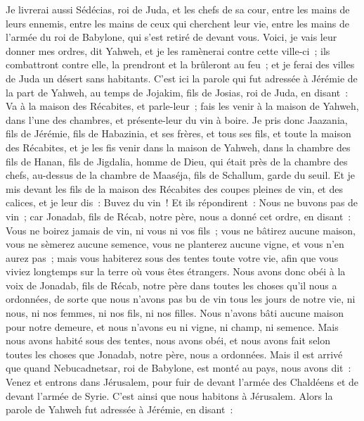 \begin{multicols}{2}
Je livrerai aussi Sédécias, roi de Juda, et les chefs de sa cour, entre les mains de leurs ennemis, entre les mains de ceux qui cherchent leur vie, entre les mains de l'armée du roi de Babylone, qui s'est retiré de devant vous.
Voici, je vais leur donner mes ordres, dit Yahweh, et je les ramènerai contre cette ville-ci~; ils combattront contre elle, la prendront et la brûleront au feu~; et je ferai des villes de Juda un désert sans habitants.
\VerseOne{}C'est ici la parole qui fut adressée à Jérémie de la part de Yahweh, au temps de Jojakim, fils de Josias, roi de Juda, en disant~:
Va à la maison des Récabites, et parle-leur~; fais les venir à la maison de Yahweh, dans l'une des chambres, et présente-leur du vin à boire.
Je pris donc Jaazania, fils de Jérémie, fils de Habazinia, et ses frères, et tous ses fils, et toute la maison des Récabites,
et je les fis venir dans la maison de Yahweh, dans la chambre des fils de Hanan, fils de Jigdalia, homme de Dieu, qui était près de la chambre des chefs, au-dessus de la chambre de Maaséja, fils de Schallum, garde du seuil.
Et je mis devant les fils de la maison des Récabites des coupes pleines de vin, et des calices, et je leur dis~: Buvez du vin~!
Et ils répondirent~: Nous ne buvons pas de vin~; car Jonadab, fils de Récab, notre père, nous a donné cet ordre, en disant~: Vous ne boirez jamais de vin, ni vous ni vos fils~;
vous ne bâtirez aucune maison, vous ne sèmerez aucune semence, vous ne planterez aucune vigne, et vous n'en aurez pas~; mais vous habiterez sous des tentes toute votre vie, afin que vous viviez longtemps sur la terre où vous êtes étrangers.
Nous avons donc obéi à la voix de Jonadab, fils de Récab, notre père dans toutes les choses qu'il nous a ordonnées, de sorte que nous n'avons pas bu de vin tous les jours de notre vie, ni nous, ni nos femmes, ni nos fils, ni nos filles.
Nous n'avons bâti aucune maison pour notre demeure, et nous n'avons eu ni vigne, ni champ, ni semence.
Mais nous avons habité sous des tentes, nous avons obéi, et nous avons fait selon toutes les choses que Jonadab, notre père, nous a ordonnées.
Mais il est arrivé que quand Nebucadnetsar, roi de Babylone, est monté au pays, nous avons dit~: Venez et entrons dans Jérusalem, pour fuir de devant l'armée des Chaldéens et de devant l'armée de Syrie. C'est ainsi que nous habitons à Jérusalem.
Alors la parole de Yahweh fut adressée à Jérémie, en disant~:

\end{multicols}
